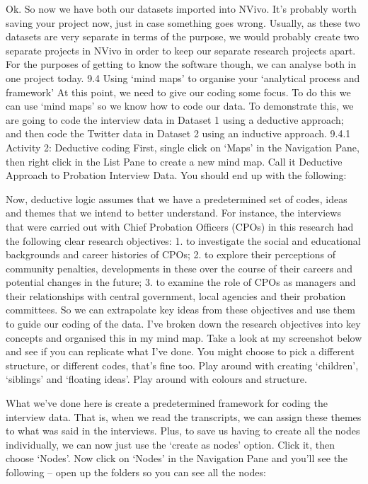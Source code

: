 \documentclass[
]{book}
\begin{document}
Ok. So now we have both our datasets imported into NVivo. It's probably worth saving your project now, just in case something goes wrong.
Usually, as these two datasets are very separate in terms of the purpose, we would probably create two separate projects in NVivo in order to keep our separate research projects apart. For the purposes of getting to know the software though, we can analyse both in one project today.
9.4 Using `mind maps' to organise your `analytical process and framework'
At this point, we need to give our coding some focus. To do this we can use `mind maps' so we know how to code our data. To demonstrate this, we are going to code the interview data in Dataset 1 using a deductive approach; and then code the Twitter data in Dataset 2 using an inductive approach.
9.4.1 Activity 2: Deductive coding
First, single click on `Maps' in the Navigation Pane, then right click in the List Pane to create a new mind map. Call it Deductive Approach to Probation Interview Data. You should end up with the following:

Now, deductive logic assumes that we have a predetermined set of codes, ideas and themes that we intend to better understand. For instance, the interviews that were carried out with Chief Probation Officers (CPOs) in this research had the following clear research objectives:
1. to investigate the social and educational backgrounds and career histories of CPOs;
2. to explore their perceptions of community penalties, developments in these over the course of their careers and potential changes in the future;
3. to examine the role of CPOs as managers and their relationships with central government, local agencies and their probation committees. So we can extrapolate key ideas from these objectives and use them to guide our coding of the data. I've broken down the research objectives into key concepts and organised this in my mind map. Take a look at my screenshot below and see if you can replicate what I've done. You might choose to pick a different structure, or different codes, that's fine too. Play around with creating `children', `siblings' and `floating ideas'. Play around with colours and structure.

What we've done here is create a predetermined framework for coding the interview data. That is, when we read the transcripts, we can assign these themes to what was said in the interviews. Plus, to save us having to create all the nodes individually, we can now just use the `create as nodes' option. Click it, then choose `Nodes'. Now click on `Nodes' in the Navigation Pane and you'll see the following -- open up the folders so you can see all the nodes:
\end{document}
